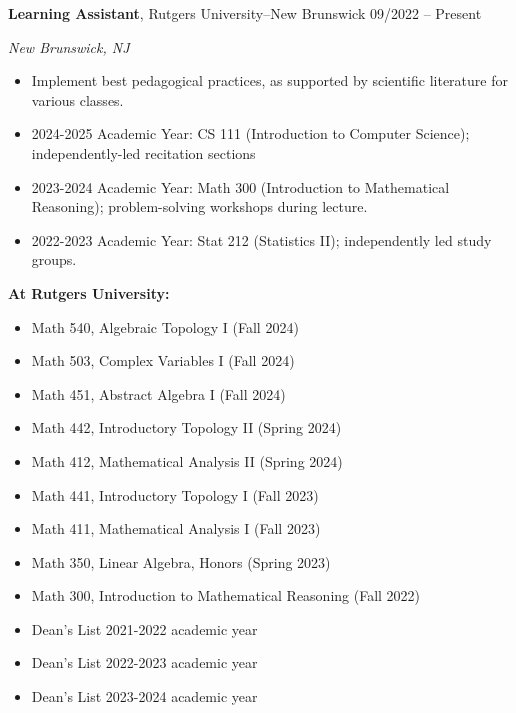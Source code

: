 \documentclass{article}
\begin{document}
		\noindent \textbf{Learning Assistant}, Rutgers University--New Brunswick \hfill 09/2022 -- Present \par 
		\noindent \textit{New Brunswick, NJ} 
		\begin{itemize}[noitemsep, nolistsep]
				\item Implement best pedagogical practices, as supported by scientific literature for various classes. 
				\item 2024-2025 Academic Year: CS 111 (Introduction to Computer Science); independently-led recitation sections
				\item 2023-2024 Academic Year: Math 300 (Introduction to Mathematical Reasoning); problem-solving workshops during lecture.
				\item 2022-2023 Academic Year: Stat 212 (Statistics II); independently led study groups.
		\end{itemize}
		\vspace{1.0em}

		\noindent \textbf{At Rutgers University:}
		\begin{itemize}[noitemsep, nolistsep]
				\item Math 540, Algebraic Topology I (Fall 2024)
				\item Math 503, Complex Variables I (Fall 2024) 
				\item Math 451, Abstract Algebra I (Fall 2024) 
				\item Math 442, Introductory Topology II (Spring 2024) 
				\item Math 412, Mathematical Analysis II (Spring 2024) 
				\item Math 441, Introductory Topology I (Fall 2023) 
				\item Math 411, Mathematical Analysis I (Fall 2023) 
				\item Math 350, Linear Algebra, Honors (Spring 2023) 
				\item Math 300, Introduction to Mathematical Reasoning (Fall 2022)
		\end{itemize}
		\vspace{1.0em} 

		\begin{itemize}[noitemsep]
				\item Dean's List 2021-2022 academic year 
				\item Dean's List 2022-2023 academic year 
				\item Dean's List 2023-2024 academic year 
		\end{itemize}
		\vspace{1.0em}
		
\end{document}
